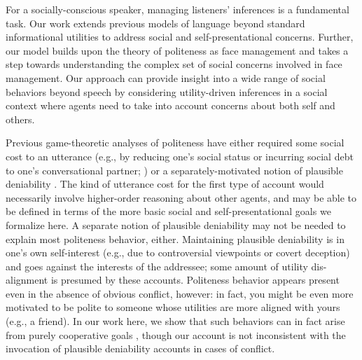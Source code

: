 \documentclass[9pt,twocolumn,twoside,lineno]{main_class_file}
\begin{document}
For a socially-conscious speaker, managing listeners' inferences is a
fundamental task. Our work extends previous models of language beyond
standard informational utilities to address social and
self-presentational concerns. Further, our model builds upon the theory of politeness as face
management \cite{brown1987} and takes a step towards
understanding the complex set of social concerns involved in face management.
Our approach can provide insight into a wide range of social behaviors beyond speech by considering utility-driven inferences in a
social context \cite{baker2017rational, hamlin2013mentalistic} where agents need to take
into account concerns about both self and others.

Previous game-theoretic analyses of politeness have either required some social cost to an utterance (e.g., by reducing one's social status or incurring social debt to one's conversational partner; \cite{vanRooy2003}) or a separately-motivated notion of plausible deniability \cite{pinker2008}.
The kind of utterance cost for the first type of account would necessarily involve higher-order reasoning about other agents, and may be able to be defined in terms of the more basic social and self-presentational goals we formalize here.
A separate notion of plausible deniability may not be needed to explain most politeness behavior, either.
Maintaining plausible deniability is in one's own self-interest (e.g., due to controversial viewpoints or covert deception) and goes against the interests of the addressee; some amount of utility dis-alignment is presumed by these accounts. Politeness behavior appears present even in the absence of obvious conflict, however: in fact, you might be even more motivated to be polite to someone whose utilities are more aligned with yours (e.g., a friend). In our work here, we show that such behaviors can in fact arise from purely cooperative goals \cite{brown1987}, though our account is not inconsistent with the invocation of plausible deniability accounts in cases of conflict.

\end{document}
